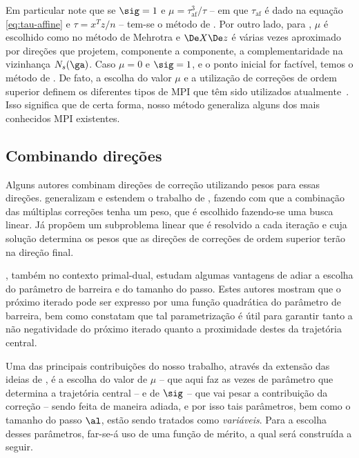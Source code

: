 Em particular note
que se  $\sig = 1$ e $\mu = \tau_{\text{af}}^3/\tau$ -- em que $\tau_{\text{af}}$ é dado
na equação \eqref{eq:tau-affine} e $\tau=x^Tz/n$ -- tem-se o método de
\textcite{Mehrotra:1992wr}. Por outro lado, para \textcite{Gondzio:1996uw}, $\mu$ é
escolhido como no método de Mehrotra e $\DeX\Dez$ é várias vezes aproximado por
direções que projetem, componente a componente, a complementaridade na
vizinhança $N_s(\ga)$. Caso $\mu=0$ e $\sig=1$, e o ponto inicial for factível, temos o método de \textcite{Monteiro:1990vn}.
 De fato, a escolha do valor $\mu$ e a utilização de
correções de ordem superior definem os diferentes tipos de \ac{MPI} que têm sido
utilizados atualmente~\cite{Wright:Primal-dual-interior-point:1997h}. Isso significa que de certa forma, nosso método generaliza alguns dos mais conhecidos \ac{MPI} existentes.




\subsection{Combinando direções}




Alguns autores 
combinam direções de correção utilizando pesos para essas direções.
 \textcite{Colombo:2008ia} generalizam e estendem o trabalho de \textcite{Gondzio:1996uw},
fazendo com que a combinação das múltiplas correções   tenha um peso, que é
escolhido fazendo-se uma busca linear. Já \textcite{Jarre:1999tl}  propõem um subproblema
linear que é resolvido a cada iteração e cuja solução determina os pesos que as direções de 
correções de ordem superior terão na direção final. 

\textcite{VillasBoas:2003tg}, também no contexto primal-dual, estudam algumas
vantagens de adiar a escolha do parâmetro de barreira e do tamanho do passo.
Estes autores mostram que o próximo iterado pode ser expresso por uma função
quadrática do parâmetro de barreira, bem como constatam que tal parametrização é útil
para garantir tanto a não negatividade do próximo iterado quanto a proximidade destes da
trajetória central. 

Uma das principais contribuições do nosso trabalho, através da extensão das ideias
de \textcite{VillasBoas:2003tg}, é a escolha do valor de $\mu$ -- que aqui faz as
vezes de parâmetro que determina a trajetória central -- e de $\sig$ -- que vai pesar a contribuição da correção --  sendo feita de maneira adiada, e
por isso tais parâmetros, bem como o tamanho do passo $\al$, estão sendo
tratados como \emph{variáveis}. Para a escolha desses parâmetros, far-se-á uso de uma
função de mérito, a qual será construída a seguir.
 
